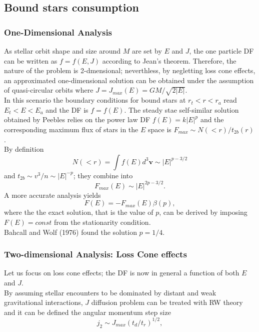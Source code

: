 \documentclass[12pt,twoside,openany]{book}
\begin{document}
\subsection{Bound stars consumption}
\subsubsection{One-Dimensional Analysis }
As stellar orbit shape and size around $M$ are set by $E$ and $J$, the one particle DF can be written as $f=f(E,J)$ according to Jean's theorem. Therefore, the nature of the problem is 2-dmensional; neverthless, by negletting loss cone effects, an approximated one-dimensional solution can be obtained under the assumption of quasi-circular orbits where $J=J_{max}(E)=GM/\sqrt{2|E|}$.\\In this scenario the boundary conditions for bound stars at $r_t<r<r_a$ read $E_t<E<E_a$ and the DF is $f=f(E)$. The steady stae self-similar solution obtained by Peebles relies on the power law DF $f(E)=k|E|^p$ and the corresponding maximum flux of stars in the $E$ space is $F_{max}\sim N(<r)/t_{2b}(r)$.\\By definition \begin{equation}
    N(<r)=\int f(E)d^3\mathbf{v}\sim |E|^{p-3/2}
\end{equation}
and $t_{2b}\sim v^3/n\sim |E|^{-p}$; they combine into
\begin{equation}
    F_{max}(E)\sim |E|^{2p-3/2}.
\end{equation}
A more accurate analysis yields
\begin{equation}
    F(E)=-F_{max}(E)\beta(p),
\end{equation}
where the the exact solution, that is the value of $p$, can be derived by imposing $F(E)=const$ from the stationarity condition.\\Bahcall and Wolf (1976) found the solution $p=1/4$.
\subsubsection{Two-dimensional Analysis: Loss Cone effects}

Let us focus on loss cone effects; the DF is now in general a function of both $E$ and $J$.\\By assuming stellar encounters to be dominated by distant and weak gravitational interactions, $J$ diffusion problem can be treated with RW theory and it can be defined the angular momentum step size
\begin{equation}\label{j_2 definition}
    j_2\sim J_{max}(t_d/t_r)^{1/2},
\end{equation}
\end{document}
